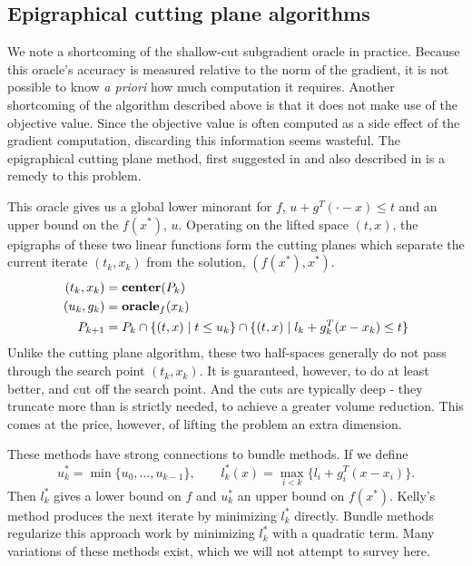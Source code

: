 \subsection{Epigraphical cutting plane algorithms}

We note a shortcoming of the shallow-cut subgradient oracle in
practice. Because this oracle's accuracy is measured relative to the
norm of the gradient, it is not possible to know \emph{a priori} how
much computation it requires. Another shortcoming of the algorithm
described above is that it does not make use of the objective value.
Since the objective value is often computed as a side effect of the
gradient computation, discarding this information seems wasteful. The
epigraphical cutting plane method, first suggested in
\cite{bahn1994experimental} and also described in
\cite{boyd2007localization,goffin1999two,mehrotra2000volumetric} is a
remedy to this problem. 

This oracle gives us a global lower minorant for $f$, $u + g^T(\cdot - x) \leq t$ and an upper bound on the $f(x^*)$, $u$. Operating on the lifted space $(t,x)$, the epigraphs of these two linear functions form the cutting planes which separate the current iterate $(t_k, x_k)$ from the solution, $(f(x^*), x^*)$. 
\begin{align*}
(t_{k},x_{k}) & =\mbox{\textbf{center}}(P_{k})\\
(u_{k},g_{k}) & = \mbox{\bf oracle}_f(x_{k})\\
P_{k+1} & =P_{k}\cap\{(t,x)\mid t\leq u_{k}\}\cap\{(t,x)\mid l_{k}+g_{k}^{T}(x-x_{k})\leq t\}
\end{align*}
Unlike the cutting plane algorithm, these two half-spaces generally do not
pass through the search point $(t_k, x_k)$. It is guaranteed, however, to do
at least better, and cut off the search point. And the cuts are typically deep - they truncate more than is strictly needed, to achieve a greater volume reduction. This comes at the price, however, of lifting the problem an extra dimension.

These methods have strong connections to bundle methods. If we define
$$
u^*_k = \min{ \{ u_0, \dots, u_{k-1}\} }, \qquad 
l^*_k(x) = \max_{i < k}\{l_i + g_i^T(x-x_i)\}.
$$Then $l^*_k$ gives a lower bound on $f$ and $u_k^*$ an upper bound on $f(x^*)$. Kelly's method \cite{kelley1960cutting} produces the next iterate by minimizing $l^*_k$ directly. Bundle methods \cite{lemarechal1975extension,wolfe1975method} regularize this approach work by minimizing $l_k^*$ with a quadratic term. Many variations of these methods exist, which we will not attempt to survey here.

